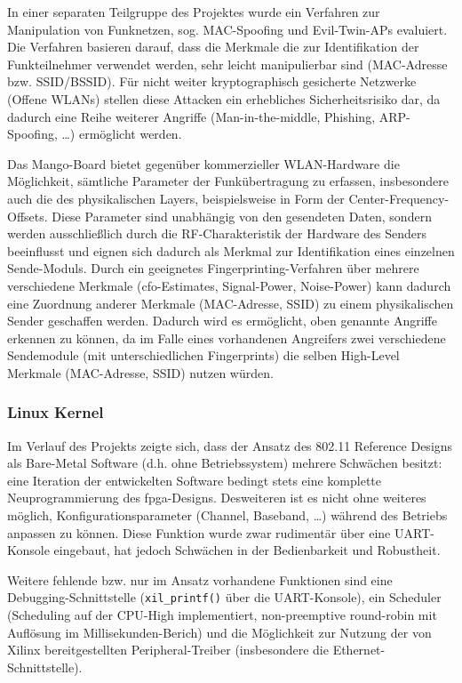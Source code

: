 \documentclass[letterpaper,11pt,ngerman]{article}
\begin{document}
\begin{onehalfspace}
In einer separaten Teilgruppe des Projektes wurde ein Verfahren zur
Manipulation von Funknetzen, sog. MAC-Spoofing und Evil-Twin-APs
evaluiert. Die Verfahren basieren darauf, dass die Merkmale die zur
Identifikation der Funkteilnehmer verwendet werden, sehr leicht
manipulierbar sind (MAC-Adresse bzw. SSID/BSSID). Für nicht weiter
kryptographisch gesicherte Netzwerke (Offene WLANs) stellen diese
Attacken ein erhebliches Sicherheitsrisiko dar, da dadurch eine Reihe
weiterer Angriffe (Man-in-the-middle, Phishing, ARP-Spoofing, \ldots{})
ermöglicht werden.

Das Mango-Board bietet gegenüber kommerzieller WLAN-Hardware die
Möglichkeit, sämtliche Parameter der Funkübertragung zu erfassen,
insbesondere auch die des physikalischen Layers, beispielsweise in Form
der Center-Frequency-Offsets. Diese Parameter sind unabhängig von den
gesendeten Daten, sondern werden ausschließlich durch die
RF-Charakteristik der Hardware des Senders beeinflusst und eignen sich
dadurch als Merkmal zur Identifikation eines einzelnen Sende-Moduls.
Durch ein geeignetes Fingerprinting-Verfahren über mehrere verschiedene
Merkmale (\ac{cfo}-Estimates, Signal-Power, Noise-Power) kann dadurch
eine Zuordnung anderer Merkmale (MAC-Adresse, SSID) zu einem
physikalischen Sender geschaffen werden. Dadurch wird es ermöglicht,
oben genannte Angriffe erkennen zu können, da im Falle eines vorhandenen
Angreifers zwei verschiedene Sendemodule (mit unterschiedlichen
Fingerprints) die selben High-Level Merkmale (MAC-Adresse, SSID) nutzen
würden.\autocite{rftap-mac}

\subsubsection{Linux Kernel}
\label{linux-kernel}

Im Verlauf des Projekts zeigte sich, dass der Ansatz des 802.11
Reference Designs als Bare-Metal Software (d.h. ohne Betriebssystem)
mehrere Schwächen besitzt: eine Iteration der entwickelten Software
bedingt stets eine komplette Neuprogrammierung des \ac{fpga}-Designs.
Desweiteren ist es nicht ohne weiteres möglich, Konfigurationsparameter
(Channel, Baseband, \ldots{}) während des Betriebs anpassen zu können.
Diese Funktion wurde zwar rudimentär über eine UART-Konsole eingebaut,
hat jedoch Schwächen in der Bedienbarkeit und Robustheit.

Weitere fehlende bzw. nur im Ansatz vorhandene Funktionen sind eine
Debugging-Schnittstelle (\texttt{xil\_printf()} über die UART-Konsole),
ein Scheduler (Scheduling auf der CPU-High implementiert, non-preemptive
round-robin mit Auflösung im Millisekunden-Berich) und die Möglichkeit
zur Nutzung der von Xilinx bereitgestellten Peripheral-Treiber
(insbesondere die Ethernet-Schnittstelle).


\end{onehalfspace}
\end{document}
